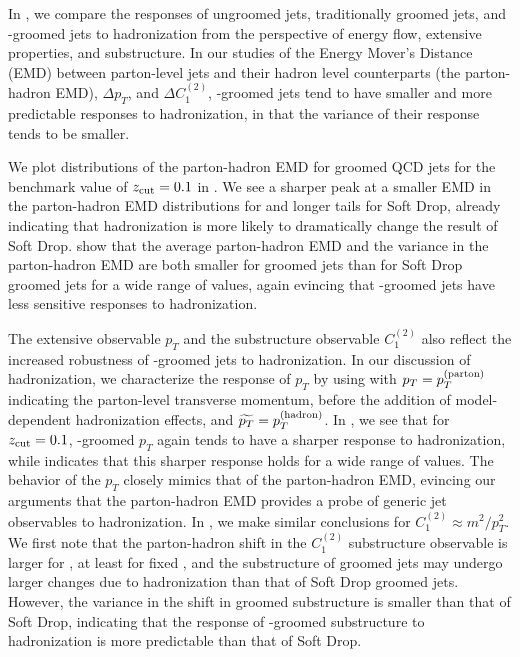 In , we compare the responses of ungroomed jets, traditionally groomed jets, and \PIRANHA{}-groomed jets to hadronization from the perspective of energy flow, extensive properties, and substructure.
%
In our studies of the Energy Mover's Distance (EMD) between parton-level jets and their hadron level counterparts (the parton-hadron EMD), \(\Delta p_T\), and \(\Delta C_1^{(2)}\), \PIRANHA{}-groomed jets tend to have smaller and more predictable responses to hadronization, in that the variance of their response tends to be smaller.

We plot distributions of the parton-hadron EMD for groomed QCD jets for the benchmark value of $z_{\rm cut}{}=0.1$ in .
%
We see a sharper peak at a smaller EMD in the parton-hadron EMD distributions for  and longer tails for Soft Drop, already indicating that hadronization is more likely to dramatically change the result of Soft Drop.
%
 show that the average parton-hadron EMD and the variance in the parton-hadron EMD are both smaller for  groomed jets than for Soft Drop groomed jets for a wide range of \zcut{} values, again evincing that \PIRANHA{}-groomed jets have less sensitive responses to hadronization.

The extensive observable \(p_T\) and the substructure observable \(C_1^{(2)}\) also reflect the increased robustness of \PIRANHA{}-groomed jets to hadronization.
%
In our discussion of hadronization, we characterize the response of \(p_T\) by using  with \(p_T = p_T^{\rm(parton)}\) indicating the parton-level transverse momentum, before the addition of model-dependent hadronization effects, and \(\widetilde{p_T} = p_T^{\rm(hadron)}\).
%
In , we see that for \(z_{\rm cut} = 0.1\), \PIRANHA{}-groomed \(p_T\) again tends to have a sharper response to hadronization, while  indicates that this sharper response holds for a wide range of \zcut{} values.
%
The behavior of the \(p_T\) closely mimics that of the parton-hadron EMD, evincing our arguments that the parton-hadron EMD provides a probe of generic jet observables to hadronization.
%
In , we make similar conclusions for \(C_1^{(2)} \approx m^2 / p_T^2\).
%
We first note that the parton-hadron shift in the \(C_1^{(2)}\) substructure observable is larger for , at least for fixed \zcut{}, and the substructure of  groomed jets may undergo larger changes due to hadronization than that of Soft Drop groomed jets.
%
However, the variance in the shift in  groomed substructure is smaller than that of Soft Drop, indicating that the response of \PIRANHA{}-groomed substructure to hadronization is more predictable than that of Soft Drop.


